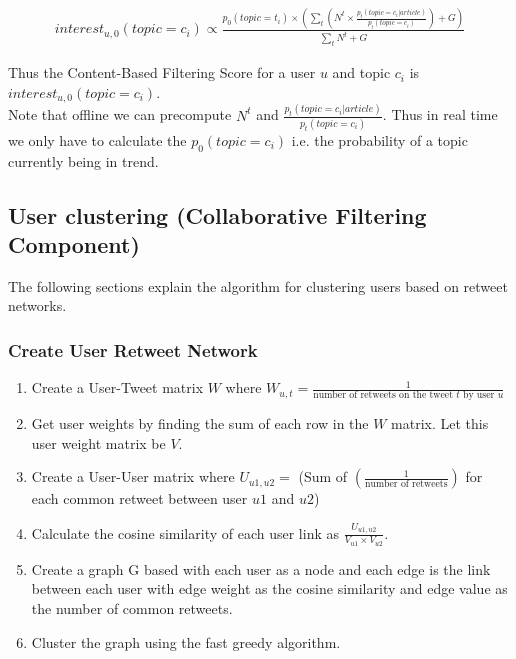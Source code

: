 \documentclass{article}
\begin{document}
\begin{equation}
\begin{aligned}
interest_{u,0}(topic = c_i) \propto \displaystyle\frac{p_0(topic = t_i) \times \left(\sum_{t} \left(N^t \times \displaystyle\frac{p_t(topic = c_i| article)}{p_t(topic = c_i)}\right) + G\right)}{\sum_{t} N^t + G }
\end{aligned}
\end{equation}

Thus the Content-Based Filtering Score for a user $u$ and topic $c_i$ is $interest_{u,0}(topic = c_i)$. \\
Note that offline we can precompute $N^t$ and $\displaystyle\frac{p_t(topic =c_i| article)}{p_t(topic = c_i)}$. Thus in real time we only have to calculate the $p_0(topic = c_i)$ i.e. the probability of a topic currently being in trend. \\

\subsection{User clustering (Collaborative Filtering Component)}

The following sections explain the algorithm for clustering users based on retweet networks.

\subsubsection{Create User Retweet Network}

\begin{enumerate}
\item Create a User-Tweet matrix $W$ where $W_{u, t} = \displaystyle\frac{1}{\textrm{number of retweets on the tweet $t$ by user $u$}}$
\item Get user weights by finding the sum of each row in the $W$ matrix. Let this user weight matrix be $V$.
\item Create a User-User matrix where $U_{u1, u2} =$ (Sum of $\left(\displaystyle\frac{1}{\textrm{number of retweets}}\right)$ for each common retweet between user $u1$ and $u2$) 
\item Calculate the cosine similarity of each user link as $\displaystyle\frac{U_{u1, u2}}{V_{u1} \times V_{u2}}$.
\item Create a graph G based with each user as a node and each edge is the link between each user with edge weight as the cosine similarity and edge value as the number of common retweets.
\item Cluster the graph using the fast greedy algorithm. 
\end{enumerate}
\end{document}
